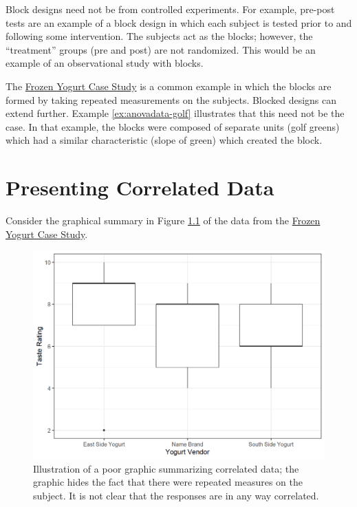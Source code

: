 \documentclass[
]{book}
\theoremstyle{plain}
\theoremstyle{mydefn}
\theoremstyle{myexmpl}
\theoremstyle{remark}
\begin{document}
Block designs need not be from controlled experiments. For example, pre-post tests are an example of a block design in which each subject is tested prior to and following some intervention. The subjects act as the blocks; however, the ``treatment'' groups (pre and post) are not randomized. This would be an example of an observational study with blocks.

The \protect\hyperlink{CaseYogurt}{Frozen Yogurt Case Study} is a common example in which the blocks are formed by taking repeated measurements on the subjects. Blocked designs can extend further. Example \ref{ex:anovadata-golf} illustrates that this need not be the case. In that example, the blocks were composed of separate units (golf greens) which had a similar characteristic (slope of green) which created the block.

\hypertarget{Blocksummaries}{%
\chapter{Presenting Correlated Data}\label{Blocksummaries}}

Consider the graphical summary in Figure \ref{fig:blocksummaries-bad-plot} of the data from the \protect\hyperlink{CaseYogurt}{Frozen Yogurt Case Study}.

\begin{figure}

{\centering \includegraphics[width=0.8\linewidth]{./Images/blocksummaries-bad-plot-1} 

}

\caption{Illustration of a poor graphic summarizing correlated data; the graphic hides the fact that there were repeated measures on the subject.  It is not clear that the responses are in any way correlated.}\label{fig:blocksummaries-bad-plot}
\end{figure}
\end{document}
